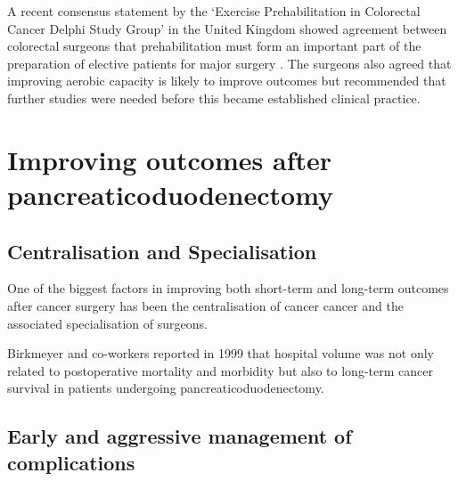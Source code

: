 A recent consensus statement by the `Exercise Prehabilitation in Colorectal Cancer Delphi Study Group' in the United Kingdom showed agreement between colorectal surgeons that prehabilitation must form an important part of the preparation of elective patients for major surgery \parencite{boereboom_forming_2015}. 
The surgeons also agreed that improving aerobic capacity is likely to improve outcomes but recommended that further studies were needed before this became established clinical practice.


\section{Improving outcomes after pancreaticoduodenectomy}

\subsection{Centralisation and Specialisation}

One of the biggest factors in improving both short-term and long-term outcomes after cancer surgery has been the centralisation of cancer cancer and the associated specialisation of surgeons. 

Birkmeyer and co-workers reported in 1999 that hospital volume was not only related to postoperative mortality and morbidity but also to long-term cancer survival in patients undergoing pancreaticoduodenectomy.


\subsection{Early and aggressive management of complications}

